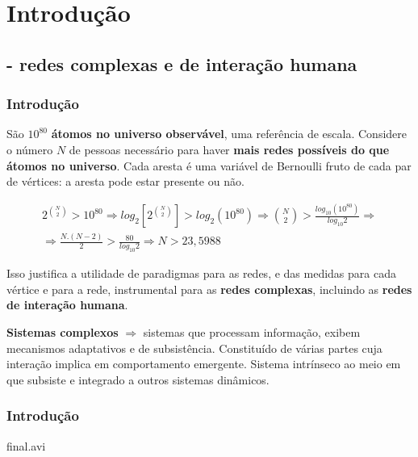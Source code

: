 \documentclass[10pt]{beamer}
\begin{document}
\section{Introdução}
\subsection{- redes complexas e de interação humana}
\begin{frame}
\frametitle{Introdução}
São $10^{80}$ {\bf átomos no universo observável},
uma referência de escala.
Considere o número $N$ de pessoas necessário para
haver {\bf mais redes possíveis do que átomos no universo}.
Cada aresta é uma variável de Bernoulli fruto de cada
par de vértices: a aresta pode estar presente ou não.

\begin{align}
2^{N \choose 2} > 10^{80} \Rightarrow 
log_2[2^{N \choose 2}] > log_2(10^{80}) \Rightarrow
{N \choose 2} > \frac{log_{10}(10^{80})}{log_{10}2} \Rightarrow \nonumber\\
\Rightarrow \frac{N.(N-2)}{2} > \frac{80}{log_{10}2} \Rightarrow
	N > 23,5988 \;\;\;\;\;\;\;\;\;\;\;\;\;\;\;\;\;\;\;\;\;
	\nonumber
\end{align}


Isso justifica a utilidade de paradigmas para as redes,
e das medidas para cada vértice e para a rede,
instrumental para as {\bf redes complexas}, incluindo
as {\bf redes de interação humana}.

{\bf Sistemas complexos} $\Rightarrow$ sistemas que processam informação,
exibem mecanismos adaptativos e de subsistência.
Constituído de várias partes cuja interação implica
em comportamento emergente. Sistema intrínseco ao meio
em que subsiste e integrado a outros sistemas dinâmicos.
\end{frame}


\begin{frame}
\frametitle{Introdução}
\begin{center}
%
{final.avi} %
\end{center}
\end{frame}
\end{document}
